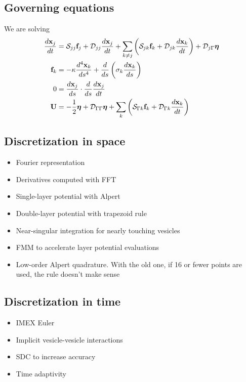 \subsection{Governing equations}
We are solving
\begin{align}
  \frac{d{\mathbf{x}}_{j}}{dt} &= {\mathcal{S}}_{jj} {\mathbf{f}}_{j} + 
    {\mathcal{D}}_{jj} \frac{d{\mathbf{x}}_{j}}{dt} +
    \sum_{k \neq j} \left({\mathcal{S}}_{jk} {\mathbf{f}}_{k} +
    {\mathcal{D}}_{jk} \frac{d{\mathbf{x}}_{k}}{dt} \right) + 
    {\mathcal{D}}_{j\Gamma} {\boldsymbol\eta} \\
  {\mathbf{f}}_{k} &= -\kappa \frac{d^{4}{\mathbf{x}}_{k}}{ds^{4}} + 
    \frac{d}{ds}\left(\sigma_{k} \frac{d{\mathbf{x}}_{k}}{ds}\right) \\
  0 &= \frac{d{\mathbf{x}}_{j}}{ds} \cdot \frac{d}{ds}\frac{d{\mathbf{x}}_{j}}{dt} \\
  {\mathbf{U}} &= - \frac{1}{2}{\boldsymbol\eta} + {\mathcal{D}}_{\Gamma\Gamma} {\boldsymbol\eta} +
    \sum_{k} \left({\mathcal{S}}_{\Gamma k} {\mathbf{f}}_{k} +
    {\mathcal{D}}_{\Gamma k} \frac{d{\mathbf{x}}_{k}}{dt} \right) 
\end{align}

\subsection{Discretization in space}
\begin{itemize}
  \item Fourier representation
  \item Derivatives computed with FFT
  \item Single-layer potential with Alpert
  \item Double-layer potential with trapezoid rule
  \item Near-singular integration for nearly touching vesicles
  \item FMM to accelerate layer potential evaluations
  \item Low-order Alpert quadrature.  With the old one, if 16 or fewer
  points are used, the rule doesn't make sense
\end{itemize}


\subsection{Discretization in time}
\begin{itemize}
  \item IMEX Euler
  \item Implicit vesicle-vesicle interactions
  \item SDC to increase accuracy
  \item Time adaptivity
\end{itemize}


